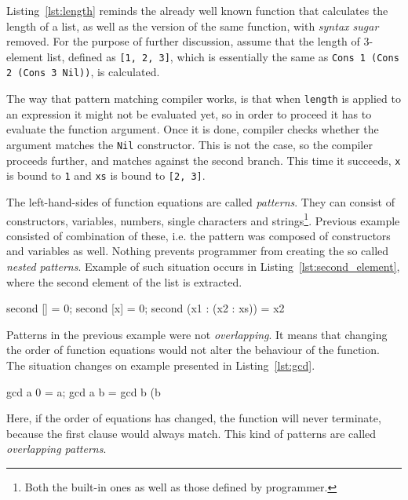 \documentclass[12pt,a4paper]{report}
\begin{document}
Listing~\ref{lst:length} reminds the already well known function that
calculates the length of a list, as well as the version of the same function,
with \textit{syntax sugar} removed. For the purpose of further discussion,
assume that the length of 3-element list, defined as \texttt{[1, 2, 3]}, which
is essentially the same as \texttt{Cons 1 (Cons 2 (Cons 3 Nil))}, is
calculated.

The way that pattern matching compiler works, is that when \texttt{length} is
applied to an expression it might not be evaluated yet, so in order to proceed
it has to evaluate the function argument. Once it is done, compiler checks
whether the argument matches the \texttt{Nil} constructor. This is not the case, so
the compiler proceeds further, and matches against the second branch. This time it
succeeds, \texttt{x} is bound to \texttt{1} and \texttt{xs} is bound to
\texttt{[2, 3]}.

The left-hand-sides of function equations are called \textit{patterns}. They
can consist of constructors, variables, numbers, single characters and
strings\footnote{Both the built-in ones as well as those defined by
programmer.}. Previous example consisted of combination of these, i.e. the
pattern was composed of constructors and variables as well. Nothing prevents
programmer from creating the so called \textit{nested patterns}. Example of
such situation occurs in Listing~\ref{lst:second_element}, where the
second element of the list is extracted.

\vspace*{0.2in}
\begin{code}[style=haskell,label=lst:second_element,caption={Greatest common divisor.}]
  second [] = 0;
  second [x] = 0;
  second (x1 : (x2 : xs)) = x2
\end{code}

Patterns in the previous example were not \textit{overlapping}. It means that
changing the order of function equations would not alter the behaviour of the
function. The situation changes on example presented in Listing~\ref{lst:gcd}.

\vspace*{0.2in}
\begin{code}[style=haskell,label=lst:gcd,caption={Greatest common divisor.}]
  gcd a 0 = a;
  gcd a b = gcd b (b %
\end{code}

Here, if the order of equations has changed, the function will never terminate,
because the first clause would always match. This kind of patterns are called
\textit{overlapping patterns}.
\end{document}
